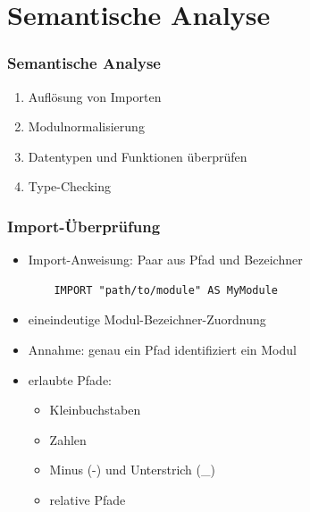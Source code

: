\section{Semantische Analyse}

\begin{frame}
\frametitle{Semantische Analyse}

\begin{enumerate}
\item Auflösung von Importen
\item Modulnormalisierung
\item Datentypen und Funktionen überprüfen
\item Type-Checking
\end{enumerate}

\end{frame}


\begin{frame}[containsverbatim=true]
\frametitle{Import-Überprüfung}

\begin{itemize}
\item Import-Anweisung: Paar aus Pfad und Bezeichner
	\begin{verbatim}
	IMPORT "path/to/module" AS MyModule
	\end{verbatim}
\item eineindeutige Modul-Bezeichner-Zuordnung
\item Annahme: genau ein Pfad identifiziert ein Modul
\item erlaubte Pfade:
	\begin{itemize}
	\item Kleinbuchstaben
	\item Zahlen
	\item Minus (-) und Unterstrich (\_)
	\item relative Pfade
	\end{itemize}
\end{itemize}

\end{frame}



